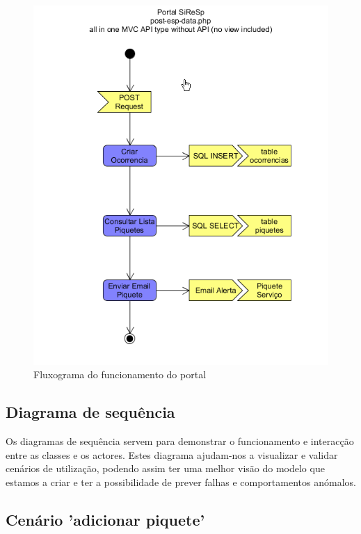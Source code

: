 \begin{figure}[!htb]
	\centering
	\includegraphics[width=\textwidth]{figuras/fluxograma_portal.png}
	\caption{Fluxograma do funcionamento do portal}
	\label{fig:fluxograma_portal}
\end{figure}

\FloatBarrier\subsection{Diagrama de sequência}

Os diagramas de sequência servem para demonstrar o funcionamento e interacção entre as classes e os actores. Estes diagrama ajudam-nos a visualizar e validar cenários de utilização, podendo assim ter uma melhor visão do modelo que estamos a criar e ter a possibilidade de prever falhas e comportamentos anómalos.

\FloatBarrier\subsection{Cenário 'adicionar piquete'}

